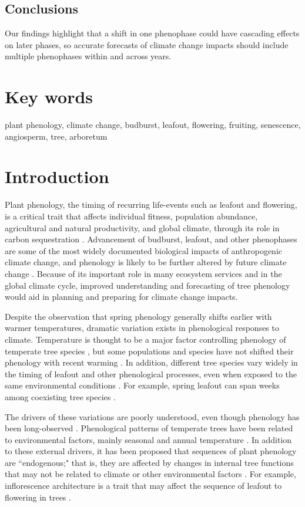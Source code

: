 \documentclass{article}
\begin{document}
\subsection*{Conclusions}
Our findings highlight that a shift in one phenophase could have cascading effects on later phases, so accurate forecasts of climate change impacts should include multiple phenophases within and across years. 

\section* {Key words}
plant phenology, climate change, budburst, leafout, flowering, fruiting, senescence, angiosperm, tree, arboretum
\section* {Introduction}
Plant phenology, the timing of recurring life-events such as leafout and flowering, is a critical trait that affects individual fitness, population abundance, agricultural and natural productivity, and global climate, through its role in carbon sequestration \citep{chuine2001,cleland2007,willis2010,miller-rushing2010,craine2012}. Advancement of budburst, leafout, and other phenophases are some of the most widely documented biological impacts of anthropogenic climate change, and phenology is likely to be further altered by future climate change \citep{parmesan2006}. Because of its important role in many ecosystem services and in the global climate cycle, improved understanding and forecasting of tree phenology would aid in planning and preparing for climate change impacts.
\par Despite the observation that spring phenology generally shifts earlier with warmer temperatures, dramatic variation exists in phenological responses to climate. Temperature is thought to be a major factor controlling phenology of temperate tree species \citep{parmesan2006, morin2010,schwartz2013}, but some populations and species have not shifted their phenology with recent warming \citep{wolkovich2012}. In addition, different tree species vary widely in the timing of leafout and other phenological processes, even when exposed to the same environmental conditions \citep{lechowicz1984,primack2009c}. For example, spring leafout can span weeks among coexisting tree species \citep{lechowicz1984}. 
\par The drivers of these variations are poorly understood, even though phenology has been long-observed \citep{wolkovich2014}. Phenological patterns of temperate trees have been related to environmental factors, mainly seasonal and annual temperature  \citep[e.g.][]{richardson2006,clark2014b}. In addition to these external drivers, it has been proposed that sequences of plant  phenology are  ``endogenous;"  that is, they are affected by changes in internal tree functions that may not be related to climate or other environmental factors \citep{borchert1992,marco2002}. For example, inflorescence architecture  is  a trait that  may affect the sequence of leafout to  flowering in trees \citep{marco2002}. 
\end{document}
